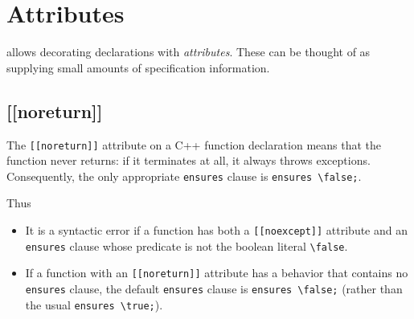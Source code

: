 \section{Attributes}
\label{sec:attributes}

\lang{} allows decorating declarations with \textit{attributes}. 
These can be thought of as supplying small amounts of specification information.

\subsection{[[noreturn]]}
\label{sec:noreturn}

The \lstinline|[[noreturn]]| attribute on a C++ function declaration means
that the function never returns: if it terminates at all, it always throws 
exceptions. Consequently, the only appropriate \lstinline|ensures| clause
is \lstinline|ensures \false;|.

Thus
\begin{itemize}
\item It is a syntactic error if a function has both a \lstinline|[[noexcept]]|
attribute and an \lstinline|ensures| clause whose predicate is not the 
boolean literal \lstinline|\false|.
\item If a function with an \lstinline|[[noreturn]]| attribute has a behavior
that contains no \lstinline|ensures| clause, the default \lstinline|ensures|
clause is \lstinline|ensures \false;| (rather than the usual \lstinline|ensures \true;|).
\end{itemize}

